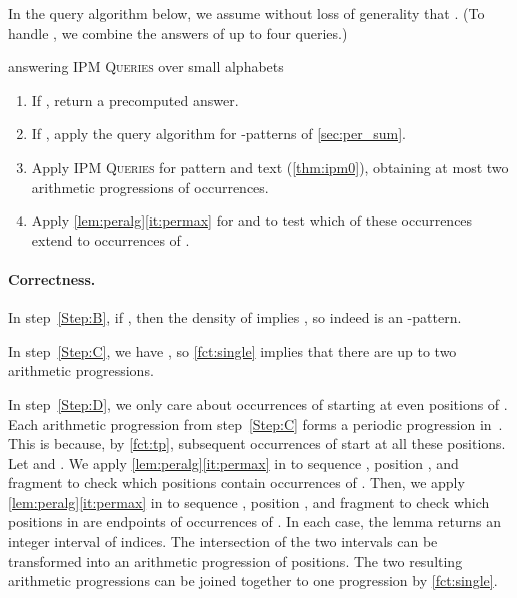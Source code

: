 \documentclass[a4paper]{article}
\theoremstyle{definition}
\theoremstyle{remark}
\newcommand{\IPM}{\textsc{IPM Queries}\xspace}
\begin{document}
In the query algorithm below, we assume without loss of generality that .
(To handle , we combine the answers of up to four queries.)

\begin{center}
\begin{minipage}{14cm}
 answering \IPM over small alphabets

  \begin{enumerate}[label=(\Alph*)]
    \item\label{Step:A} If , return a precomputed answer.
    \item\label{Step:B} If , apply the query algorithm for -patterns of \cref{sec:per_sum}.
    \item\label{Step:C} Apply \IPM for pattern  and text  (\cref{thm:ipm0}), obtaining
    at most two arithmetic progressions of occurrences.
    \item\label{Step:D} 
    Apply \cref{lem:peralg}\ref{it:permax} for  and  to test which of these occurrences extend to occurrences of .
  \end{enumerate}
  \end{minipage}
\end{center}

\paragraph*{Correctness.}
In step~\ref{Step:B}, if , then the density of  implies , so indeed  is an -pattern.

In step~\ref{Step:C}, we have , so \cref{fct:single} implies that there are up to two arithmetic progressions.

In step~\ref{Step:D}, we only care about occurrences of  starting at even positions of .
Each arithmetic progression from step~\ref{Step:C} forms a periodic progression  in~.
This is because, by \cref{fct:tp}, subsequent occurrences of  start at all these positions.
Let  and .
We apply \cref{lem:peralg}\ref{it:permax} in  to sequence , position , and fragment  to check which positions  contain occurrences of .
Then, we apply \cref{lem:peralg}\ref{it:permax} in  to sequence
, position , and fragment 
to check which positions  in  are endpoints of occurrences of .
In each case, the lemma returns an integer interval of indices.
The intersection of the two intervals can be transformed into an arithmetic progression of positions.
The two resulting arithmetic progressions can be joined together to one progression by \cref{fct:single}.
\end{document}
